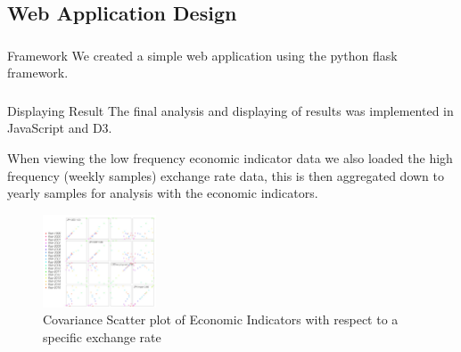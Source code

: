 \subsection{Web Application Design}
\subsubsection{}{Framework}
We created a simple web application using the python flask framework.
\subsubsection{}{Displaying Result}
The final analysis and displaying of results was implemented in JavaScript and D3.  

When viewing the low frequency economic indicator data we also loaded the high frequency (weekly samples) exchange rate data, this is then aggregated down to yearly samples for analysis with the economic indicators.
\newline
 
\begin{figure}[!h]
	\begin{center}
		\includegraphics[width=0.30\textwidth]{web.jpg}
		\caption{Covariance Scatter plot of Economic Indicators with respect to a specific exchange rate}
		\label{scatter_plot}
	\end{center}
\end{figure}

